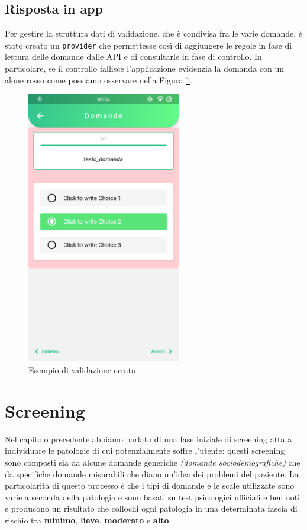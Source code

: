 \subsection{Risposta in app}
Per gestire la struttura dati di validazione, che è condivisa fra le varie domande, è stato creato un \texttt{provider} che permettesse così di aggiungere le regole in fase di lettura delle domande dalle API e di consultarle in fase di controllo. In particolare, se il controllo fallisce l'applicazione evidenzia la domanda con un alone rosso come possiamo osservare nella Figura \ref{fig:validation_errata}.

\begin{figure}[h!]
\centering
\includegraphics[width=0.6\textwidth]{img/validation_errata}
\caption{Esempio di validazione errata}
\label{fig:validation_errata}
\end{figure}

\section{Screening}
Nel capitolo precedente abbiamo parlato di una fase iniziale di screening atta a individuare le patologie di cui potenzialmente soffre l'utente: questi screening sono composti sia da alcune domande generiche \textit{(domande sociodemografiche)} che da specifiche domande misurabili che diano un'idea dei problemi del paziente. La particolarità di questo processo è che i tipi di domande e le scale utilizzate sono varie a seconda della patologia e sono basati su test psicologici ufficiali e ben noti e producono un risultato che collochi ogni patologia in una determinata fascia di rischio tra \textbf{minimo}, \textbf{lieve}, \textbf{moderato} e \textbf{alto}.

